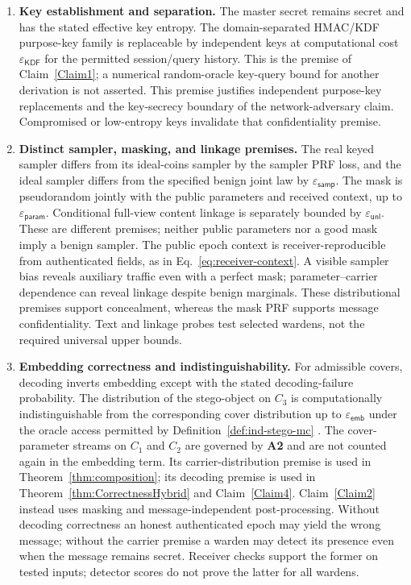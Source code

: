 \documentclass[pdflatex,sn-mathphys-num]{sn-jnl}%
\theoremstyle{definition}
\theoremstyle{game}
\theoremstyle{thmstyleone}%
\theoremstyle{thmstyletwo}%
\theoremstyle{thmstylethree}%
\begin{document}
\begin{enumerate}[
    label=\textbf{A\arabic*.},
    leftmargin=2.3em,
    itemsep=0.35em,
    topsep=0.35em
]

\item \textbf{Key establishment and separation.}
The master secret remains secret and has the stated effective key entropy.
The domain-separated HMAC/KDF purpose-key family is replaceable by independent
keys at computational cost $\varepsilon_{\mathsf{KDF}}$ for the permitted
session/query history. This is the premise of Claim~\ref{Claim1}; a numerical
random-oracle key-query bound for another derivation is not asserted.
This premise justifies independent purpose-key replacements and the
key-secrecy boundary of the network-adversary claim.
Compromised or low-entropy keys invalidate that confidentiality premise.

\item \textbf{Distinct sampler, masking, and linkage premises.}
The real keyed sampler differs from its ideal-coins sampler by the sampler
PRF loss, and the ideal sampler differs from the specified benign joint law
by $\varepsilon_{\mathsf{samp}}$. The mask is pseudorandom jointly with
the public parameters and received context, up to
$\varepsilon_{\mathsf{param}}$. Conditional full-view content linkage is
separately bounded by $\varepsilon_{\mathsf{unl}}$.
These are different premises; neither public parameters nor a good mask
imply a benign sampler. The public epoch context is receiver-reproducible from
authenticated fields, as in Eq.~\eqref{eq:receiver-context}.
A visible sampler bias reveals auxiliary traffic even with a perfect mask;
parameter--carrier dependence can reveal linkage despite benign marginals.
These distributional premises support concealment, whereas the mask PRF
supports message confidentiality. Text and linkage probes test selected
wardens, not the required universal upper bounds.

\item \textbf{Embedding correctness and
indistinguishability.}
For admissible covers, decoding inverts embedding except with
the stated decoding-failure probability. The distribution of the
stego-object on $C_3$ is computationally indistinguishable from
the corresponding cover distribution up to
$\varepsilon_{\mathsf{emb}}$ under the oracle access permitted
by Definition~\ref{def:ind-stego-mc}
\cite{@hopper2009provably,vonahn2003publickey}.
The cover-parameter streams on $C_1$ and $C_2$ are governed by
\textbf{A2} and are not counted again in the embedding term.
Its carrier-distribution premise is used in Theorem~\ref{thm:composition};
its decoding premise is used in Theorem~\ref{thm:CorrectnessHybrid} and
Claim~\ref{Claim4}. Claim~\ref{Claim2} instead uses masking and
message-independent post-processing.
Without decoding correctness an honest authenticated epoch may yield the
wrong message; without the carrier premise a warden may detect its presence
even when the message remains secret. Receiver checks support the former
on tested inputs; detector scores do not prove the latter for all wardens.


\end{enumerate}
\end{document}
